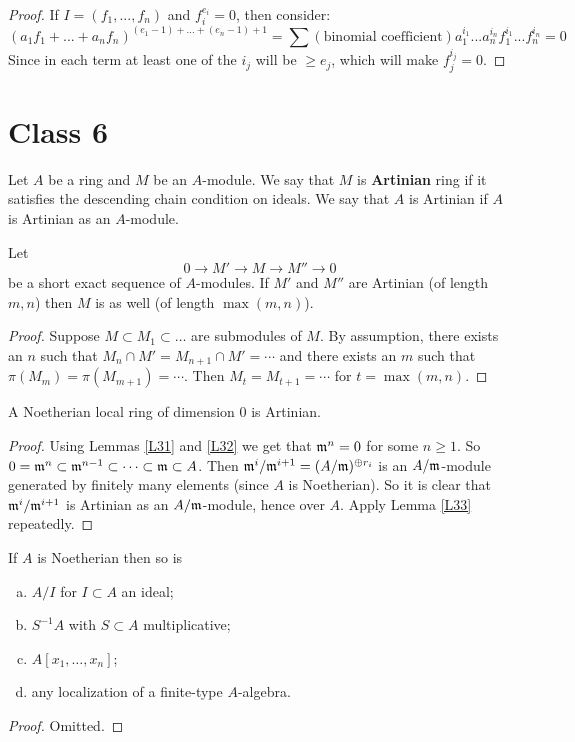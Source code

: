 \documentclass{../mathnotes}
\begin{document}
\begin{proof}
If $I = (f_1, ... , f_n)$ and $f_i^{e_i} = 0$, then consider:
\[     (a_1 f_1 + ... + a_n f_n)^{(e_1 - 1) + ... + (e_n -1) + 1} = \sum (\text{binomial coefficient}) a_1^{i_1}...a_n^{i_n} f_1^{i_1}...f_n^{i_n} =0   \]
Since in each term at least one of the $i_j$ will be $\geq e_j$, which will make $f_j^{i_j} = 0$.
\end{proof}

\section*{Class 6}

\begin{defn}
Let $A$ be a ring and $M$ be an $A$-module. We say that $M$ is \textbf{Artinian} ring if it satisfies the descending chain condition on ideals. We say that $A$ is Artinian if $A$ is Artinian as an $A$-module.
\end{defn}

\begin{lem}
\label{L33}
Let
\[0\to M'\to M\to M''\to 0\]
be a short exact sequence of $A$-modules. If $M'$ and $M''$ are Artinian (of length $m,n$) then $M$ is as well (of length $\max(m,n)$).
\end{lem}
\begin{proof}
Suppose $M\subset M_1\subset\ldots$ are submodules of $M$. By assumption, there exists an $n$ such that $M_n\cap M'=M_{n+1}\cap M'=\cdots$ and there exists an $m$ such that $\pi(M_m)=\pi(M_{m+1})=\cdots$. Then $M_t=M_{t+1}=\cdots$ for $t=\max(m,n)$.
\end{proof}

\begin{lem}
\label{L34}
A Noetherian local ring of dimension 0 is Artinian.
\end{lem}
\begin{proof}
Using Lemmas \ref{L31} and \ref{L32} we get that $\mathfrak m^n=0$ for some $n\geq 1$. So $0=\mathfrak m^n\subset\mathfrak m^{n-1}\subset\cdots\subset\mathfrak m\subset A$. Then $\mathfrak m^i/\mathfrak m^{i+1}=(A/\mathfrak m)^{\oplus r_i}$ is an $A/\mathfrak m$-module generated by finitely many elements (since $A$ is Noetherian). So it is clear that $\mathfrak m^i/\mathfrak m^{i+1}$ is Artinian as an $A/\mathfrak m$-module, hence over $A$. Apply Lemma \ref{L33} repeatedly.
\end{proof}

\begin{lem}
\label{L35}
If $A$ is Noetherian then so is
\begin{enumerate}[(a)]
\item $A/I$ for $I\subset A$ an ideal;
\item $S^{-1}A$ with $S\subset A$ multiplicative;
\item $A[x_1,\ldots,x_n]$;
\item any localization of a finite-type $A$-algebra.
\end{enumerate}
\end{lem}
\begin{proof}
Omitted.
\end{proof}
\end{document}
